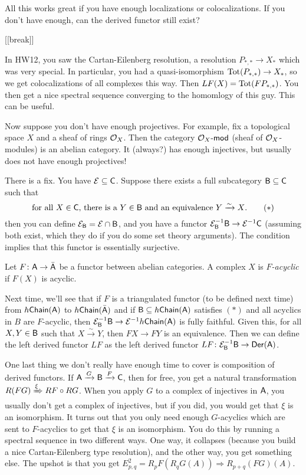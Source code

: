 All this works great if you have enough localizations or colocalizations. If you don't have enough, can the derived functor still exist?

[[break]]

\begin{remark}
 In HW12, you saw the Cartan-Eilenberg resolution, a resolution $P_{*,*}\to X_*$ which was very special. In particular, you had a quasi-isomorphism $\operatorname{Tot}(P_{*,*})\to X_*$, so we get colocalizations of all complexes this way. Then $LF(X) = \operatorname{Tot}(FP_{*,*})$. You then get a nice spectral sequence converging to the homomlogy of this guy. This can be useful.
\end{remark}

Now suppose you don't have enough projectives. For example, fix a topological space $X$ and a sheaf of rings $\mathcal{O}_X$. Then the category $\mathcal{O}_X\textrm{-\sf mod}$ (sheaf of $\mathcal{O}_X$-modules) is an abelian category. It (always?) has enough injectives, but usually does not have enough projectives!

There is a fix. You have $\mathcal{E}\subseteq \text{\sf C}$. Suppose there exists a full subcategory $\text{\sf B}\subseteq \text{\sf C}$ such that 
\[
 \text{for all $X\in \text{\sf C}$, there is a $Y\in \text{\sf B}$ and an equivalence $Y\xrightarrow\sim X$.} \tag{$*$}
\]
then you can define $\mathcal{E}_{\text{\sf B}}=\mathcal{E}\cap\text{\sf B}$, and you have a functor $\mathcal{E}_{\text{\sf B}}^{-1}\text{\sf B}\to \mathcal{E}^{-1}\text{\sf C}$ (assuming both exist, which they do if you do some set theory arguments). The condition implies that this functor is essentially surjective.
\begin{definition}
 Let $F\colon \text{\sf A}\to \bar{\text{\sf A}}$ be a functor between abelian categories. A complex $X$ is \emph{$F$-acyclic} if $F(X)$ is acyclic.
\end{definition}
Next time, we'll see that if $F$ is a triangulated functor (to be defined next time) from $h\text{\sf Chain}(\text{\sf A})$ to $h\text{\sf Chain}(\bar{\text{\sf A}})$ and if $\text{\sf B}\subseteq h\text{\sf Chain}(\text{\sf A})$ satisfies $(*)$ and all acyclics in $B$ are $F$-acyclic, then $\mathcal{E}^{-1}_{\text{\sf B}}\text{\sf B}\to \mathcal{E}^{-1}h\text{\sf Chain}(\text{\sf A})$ is fully faithful. Given this, for all $X,Y\in \text{\sf B}$ such that $X\xrightarrow\sim Y$, then $FX\to FY$ is an equivalence. Then we can define the left derived functor $LF$ as the left derived functor $LF\colon\mathcal{E}^{-1}_{\text{\sf B}}\text{\sf B}\to \operatorname{\sf Der}(\text{\sf A})$.

One last thing we don't really have enough time to cover is composition of derived functors. If $\text{\sf A}\xrightarrow G \text{\sf B}\xrightarrow F \text{\sf C}$, then for free, you get a natural transformation $R(FG)\xRightarrow\xi RF\circ RG$. When you apply $G$ to a complex of injectives in $\text{\sf A}$, you usually don't get a complex of injectives, but if you did, you would get that $\xi$ is an isomorphism. It turns out that you only need enough $G$-acyclics which are sent to $F$-acyclics to get that $\xi$ is an isomorphism. You do this by running a spectral sequence in two different ways. One way, it collapses (because you build a nice Cartan-Eilenberg type resolution), and the other way, you get something else. The upshot is that you get $E^2_{p,q}=R_pF(R_qG(A))\Rightarrow R_{p+q}(FG)(A)$.
